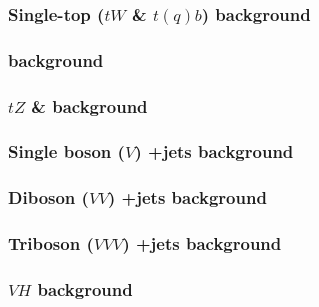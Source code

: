 \documentclass[../thesis.tex]{subfiles}
\begin{document}
\subsubsection*{Single-top ($tW$ \& $t(q)b$) background}
\subsubsection*{\tWZ background}
\subsubsection*{$tZ$ \& \ttVV background}
\subsubsection*{Single boson ($V$) +jets background}
\subsubsection*{Diboson ($VV$) +jets background}
\subsubsection*{Triboson ($VVV$) +jets background}
\subsubsection*{$VH$ background}
\end{document}
